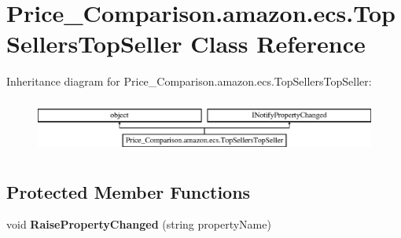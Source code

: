 \hypertarget{class_price___comparison_1_1amazon_1_1ecs_1_1_top_sellers_top_seller}{\section{Price\-\_\-\-Comparison.\-amazon.\-ecs.\-Top\-Sellers\-Top\-Seller Class Reference}
\label{class_price___comparison_1_1amazon_1_1ecs_1_1_top_sellers_top_seller}
}


 


Inheritance diagram for Price\-\_\-\-Comparison.\-amazon.\-ecs.\-Top\-Sellers\-Top\-Seller\-:\begin{figure}[H]
\begin{center}
\leavevmode
\includegraphics[height=1.789137cm]{class_price___comparison_1_1amazon_1_1ecs_1_1_top_sellers_top_seller}
\end{center}
\end{figure}
\subsection*{Protected Member Functions}
\begin{DoxyCompactItemize}
\item 
\hypertarget{class_price___comparison_1_1amazon_1_1ecs_1_1_top_sellers_top_seller_a15ce3da69537bf7b6bcc69e94d82512a}{void {\bfseries Raise\-Property\-Changed} (string property\-Name)}\label{class_price___comparison_1_1amazon_1_1ecs_1_1_top_sellers_top_seller_a15ce3da69537bf7b6bcc69e94d82512a}

\end{DoxyCompactItemize}
